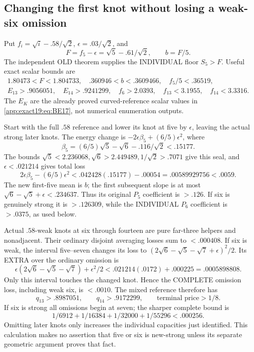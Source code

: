 \documentclass[11pt]{article}
\theoremstyle{definition}
\theoremstyle{remark}
\begin{document}
\subsection{Changing the first knot without losing a weak-six omission}
\label{app:exact19:Dmixedfloors}

Put \(f_i=\sqrt i-.58/\sqrt2\), \(\epsilon=.03/\sqrt2\), and
\[
 F=f_5-\epsilon=\sqrt5-.61/\sqrt2,\qquad b=F/5 .
\]
The independent OLD theorem supplies the INDIVIDUAL floor \(S_5>F\).
Useful exact scalar bounds are
\[
\begin{gathered}
 1.80473<F<1.804733,\quad .360946<b<.3609466,\quad f_5/5<.36519,\\
 E_{13}>.9056051,\quad E_{14}>.9241299,\quad
 f_6>2.0393,\quad f_{13}<3.1955,\quad f_{14}<3.3316 .
\end{gathered}
\]
The \(E_K\) are the already proved curved-reference scalar values
in \eqref{app:exact19:eq:BE17}, not numerical enumeration outputs.

Start with the full \(.58\) reference and lower its knot at five by
\(\epsilon\), leaving the actual strong later knots.
The energy change is
\(-2\epsilon\beta_5+(6/5)\epsilon^2\), where
\[
 \beta_5=(6/5)\sqrt5-\sqrt6-.116/\sqrt2<.15177 .
\]
The bounds \(\sqrt5<2.236068,\sqrt6>2.449489,1/\sqrt2>.7071\)
give this seal, and \(\epsilon<.021214\) gives total loss
\[
             2\epsilon\beta_5-(6/5)\epsilon^2
                      <.042428(.15177)-.00054=.00589929756<.0059 .
\]
The new first-five mean is \(b\); the first subsequent slope is at most
\(\sqrt6-\sqrt5+\epsilon<.234637\).
Thus its original \(P_5\) coefficient is \(>.126\).
If six is genuinely strong it is \(>.126309\), while the INDIVIDUAL
\(P_6\) coefficient is \(>.0375\), as used below.

Actual \(.58\)-weak knots at six through fourteen are pure far-three
helpers and nonadjacent. Their ordinary disjoint averaging losses sum
to \(<.000408\). If six is weak, the interval five--seven changes its
loss to \((2\sqrt6-\sqrt5-\sqrt7+\epsilon)^2/2\).
Its EXTRA over the ordinary omission is
\[
 \epsilon(2\sqrt6-\sqrt5-\sqrt7)+\epsilon^2/2
          <.021214(.0172)+.000225=.0005898808 .
\]
Only this interval touches the changed knot. Hence the COMPLETE
omission loss, including weak six, is \(<.0010\).
The mixed reference therefore has
\[
                  q_{13}>.8987051,\qquad q_{14}>.9172299,
                                      \qquad \text{terminal price}>1/8 .
\tag{D19mixedenergy}\label{app:exact19:eq:Dmixedenergy}
\]
If six is strong all omissions begin at seven; the sharper complete
bound is
\[
         1/6912+1/16384+1/32000+1/55296<.000256 .
\]
Omitting later knots only increases the individual capacities just
identified. This calculation makes no assertion that five or six is
new-strong unless its separate geometric argument proves that fact.
\end{document}
